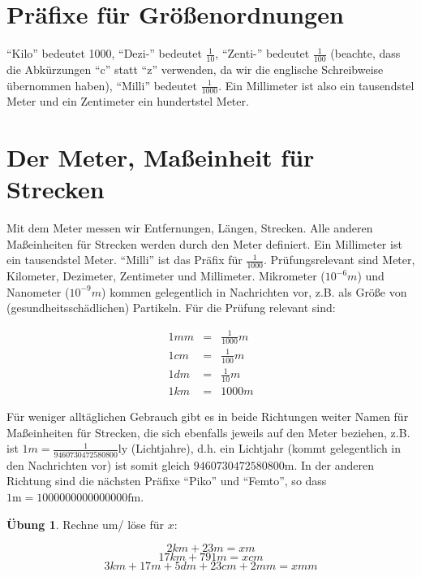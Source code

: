 \documentclass[a4paper]{book}%
\theoremstyle{definition}
\newtheorem{uebung}{Übung}
\begin{document}
\section{Präfixe für Größenordnungen}

\enquote{Kilo} bedeutet 1000, \enquote{Dezi-} bedeutet $\frac{1}{10}$, \enquote{Zenti-} bedeutet $\frac{1}{100}$ (beachte, dass die Abkürzungen \enquote{c} statt \enquote{z} verwenden, da wir die englische Schreibweise übernommen haben), \enquote{Milli} bedeutet $\frac{1}{1000}$. Ein Millimeter ist also ein tausendstel Meter und ein Zentimeter ein hundertstel Meter.

\section{Der Meter, Maßeinheit für Strecken}

Mit dem Meter messen wir Entfernungen, Längen, Strecken. Alle anderen Maßeinheiten für Strecken werden durch den Meter definiert. Ein Millimeter ist ein tausendstel Meter. \enquote{Milli} ist das Präfix für $\frac{1}{1000}$. Prüfungsrelevant sind Meter, Kilometer, Dezimeter, Zentimeter und Millimeter. Mikrometer ($10^{-6}m$) und Nanometer ($10^{-9}m$) kommen gelegentlich in Nachrichten vor, z.B. als Größe von (gesundheitsschädlichen) Partikeln. Für die Prüfung relevant sind:

\begin{eqnarray*}
  1mm &=& \frac{1}{1000}m \\
  1cm &=& \frac{1}{100}m \\
  1dm &=& \frac{1}{10}m \\
  1km &=& 1000m
\end{eqnarray*}

Für weniger alltäglichen Gebrauch gibt es in beide Richtungen weiter Namen für Maßeinheiten für Strecken, die sich ebenfalls jeweils auf den Meter beziehen, z.B. ist $1m = \frac{1}{9460730472580800}\text{ly}$ (Lichtjahre), d.h. ein Lichtjahr (kommt gelegentlich in den Nachrichten vor) ist somit gleich $9460730472580800\text{m}$. In der anderen Richtung sind die nächsten Präfixe \enquote{Piko} und \enquote{Femto}, so dass $1\text{m}=1000000000000000\text{fm}$.

\begin{uebung}
    Rechne um/ löse für $x$:

    \begin{equation}
        2km + 23m = x m
    \end{equation}
    \begin{equation}
        17km + 791m = x cm
    \end{equation}
    \begin{equation}
        3km + 17m + 5dm + 23cm + 2mm = x mm
    \end{equation}
\end{uebung}
\end{document}
